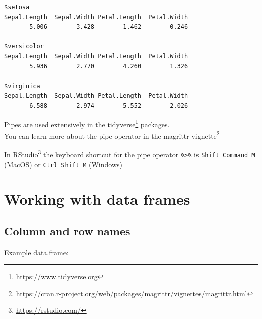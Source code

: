\documentclass[
]{book}
\DeclareRobustCommand{\href}[2]{#2\footnote{\url{#1}}}
\begin{document}
\begin{verbatim}
$setosa
Sepal.Length  Sepal.Width Petal.Length  Petal.Width 
       5.006        3.428        1.462        0.246 

$versicolor
Sepal.Length  Sepal.Width Petal.Length  Petal.Width 
       5.936        2.770        4.260        1.326 

$virginica
Sepal.Length  Sepal.Width Petal.Length  Petal.Width 
       6.588        2.974        5.552        2.026 
\end{verbatim}

Pipes are used extensively in the \href{https://www.tidyverse.org}{tidyverse} packages.\\
You can learn more about the pipe operator in the \href{https://cran.r-project.org/web/packages/magrittr/vignettes/magrittr.html}{magrittr vignette}

\begin{rmdtip}
In \href{https://rstudio.com/}{RStudio} the keyboard shortcut for the
pipe operator \texttt{\%\textgreater{}\%} is \texttt{Shift\ Command\ M}
(MacOS) or \texttt{Ctrl\ Shift\ M} (Windows)
\end{rmdtip}

\hypertarget{dataframes}{%
\chapter{Working with data frames}\label{dataframes}}

\hypertarget{column-and-row-names}{%
\section{Column and row names}\label{column-and-row-names}}

Example data.frame:
\end{document}
